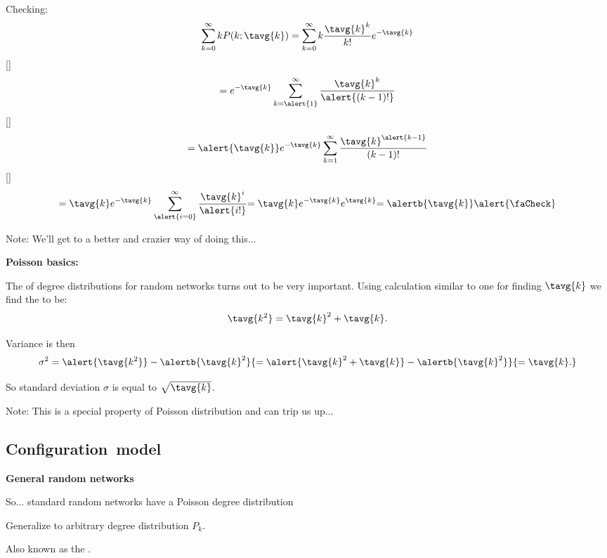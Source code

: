 \begin{frame}[label=]
\begin{frame}[label=]
\begin{frame}[label=]
\begin{frame}[label=]
\begin{frame}[label=]
\begin{frame}[label=]
\begin{frame}[label=]
\begin{frame}[label=]
\begin{frame}[label=]
\begin{frame}[label=]
\begin{frame}[label=]
    Checking:
    $$ 
    \sum_{k=0}^\infty
    k P(k;\tavg{k})
    =
    \sum_{k=0}^\infty
    k \frac{\tavg{k}^k}
    {k!}
    e^{-\tavg{k}}
    $$
  []
    $$
    = e^{-\tavg{k}}
    \sum_{k=\alert{1}}^\infty
    \frac{\tavg{k}^k}
    {\alert{(k-1)!}}
    $$
  []
    $$
    = 
    \alert{\tavg{k}}
    e^{-\tavg{k}}
    \sum_{k={1}}^\infty
    \frac{\tavg{k}^{\alert{k-1}}}
    {{(k-1)!}}
    $$
  []
    $$
    = 
    \tavg{k}
    e^{-\tavg{k}}
    \sum_{\alert{i=0}}^\infty
    \frac{\tavg{k}^{i}}
    {\alert{i!}}
    {
      =
      \tavg{k}
    e^{-\tavg{k}}
    e^{\tavg{k}}
    }
    {
      =
      \alertb{\tavg{k}}
      \alert{\faCheck}
    }
    $$
  
    Note: We'll get to a better and crazier way of doing this...
  


\begin{frame}[label=]
  \textbf{Poisson basics:}

    
     The  of degree distributions
      for random networks turns out to be \alert{very important}.
     Using calculation similar to one for finding $\tavg{k}$
      we find the  to be:
      $$
      \tavg{k^2} = \tavg{k}^2 + \tavg{k}.
      $$
     
      Variance is then
      $$
      \sigma^2 = \alert{\tavg{k^2}} - \alertb{\tavg{k}^2} 
      {
        = 
        \alert{\tavg{k}^2 + \tavg{k}} - \alertb{\tavg{k}^2}
      }
      {
        = 
        \tavg{k}.
      }
      $$
    
      So standard deviation $\sigma$ is equal to $\sqrt{\tavg{k}}$.
    
      Note: This is a special property of Poisson distribution 
      and can trip us up...
    


\subsection{Configuration\ model}

\begin{frame}[label=]
  \textbf{General random networks}

  
  
    So... standard random networks have a Poisson degree distribution
  
    Generalize to arbitrary degree distribution $P_k$.
  
    Also known as the .\cite{newman2003a}
  

\end{frame}
\end{frame}
\end{frame}
\end{frame}
\end{frame}
\end{frame}
\end{frame}
\end{frame}
\end{frame}
\end{frame}
\end{frame}
\end{frame}
\end{frame}
